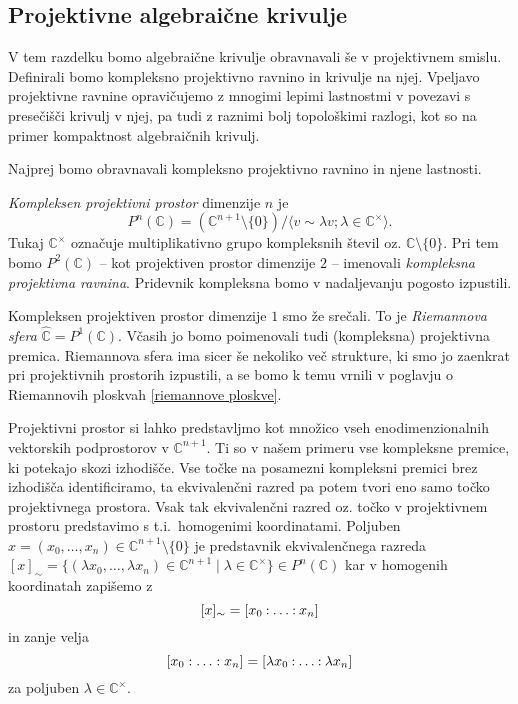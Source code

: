 \documentclass[mat1]{fmfdelo}
\numberwithin{equation}{section}
\newcommand{\C}{\mathbb C}
\newcommand{\CM}{\mathbb C ^\times}
\newcommand{\PC}{P^2(\mathbb C)}
\newcommand{\pcoor}[1]{%
\begingroup\lccode`~=`: \lowercase{\endgroup
\edef~}{\mathbin{\mathchar\the\mathcode`:}\nobreak}%
\left[%
\begingroup
\mathcode`:=\string"8000
#1%
\endgroup
\right]%
}
\theoremstyle{definition}
\begin{document}
 

\subsection{Projektivne algebraične krivulje}

V tem razdelku bomo algebraične krivulje obravnavali še v projektivnem smislu. Definirali bomo kompleksno projektivno ravnino in krivulje na njej. Vpeljavo projektivne ravnine opravičujemo z mnogimi lepimi lastnostmi v povezavi s presečišči krivulj v njej, pa tudi z raznimi bolj topološkimi razlogi, kot so na primer kompaktnost algebraičnih krivulj.

Najprej bomo obravnavali kompleksno projektivno ravnino in njene lastnosti. 
\begin{definicija}
    \emph{Kompleksen projektivni prostor} dimenzije $n$ je 
    \[
        P^n(\C) = (\C^{n+1} \setminus \{0 \}) / \langle v \sim \lambda v; \lambda \in \C^{\times} \rangle.
    \]
    Tukaj $\C^{\times}$ označuje multiplikativno grupo kompleksnih števil oz. $\C \setminus \{0 \}$. 
    Pri tem bomo $\PC$ -- kot projektiven prostor dimenzije $2$ -- imenovali \emph{kompleksna projektivna ravnina}. Pridevnik kompleksna bomo v nadaljevanju pogosto izpustili.
\end{definicija}

\begin{primer*}
    Kompleksen projektiven prostor dimenzije $1$ smo že srečali. To je \emph{Riemannova sfera} $\widehat{\C} = P^1(\C)$. Včasih jo bomo poimenovali tudi (kompleksna) projektivna premica. Riemannova sfera ima sicer še nekoliko več strukture, ki smo jo zaenkrat pri projektivnih prostorih izpustili, a se bomo k temu vrnili v poglavju o Riemannovih ploskvah \ref{riemannove ploskve}.
\end{primer*}

Projektivni prostor si lahko predstavljmo kot množico vseh enodimenzionalnih vektorskih podprostorov v $\C^{n+1}$. Ti so v našem primeru vse kompleksne premice, ki potekajo skozi izhodišče. Vse točke na posamezni kompleksni premici brez izhodišča identificiramo, ta ekvivalenčni razred pa potem tvori eno samo točko projektivnega prostora. Vsak tak ekvivalenčni razred oz. točko v projektivnem prostoru predstavimo s t.i.\ homogenimi koordinatami. Poljuben $x = (x_0, \dots, x_n) \in \C^{n+1}\setminus \{0\}$ je predstavnik ekvivalenčnega razreda $[x]_\sim = \{(\lambda x_0, \dots, \lambda x_n) \in \C^{n+1} \mid \lambda \in \CM\} \in P^n(\C)$ kar v homogenih koordinatah zapišemo z
    \[
        [x]_\sim = \pcoor{x_0 : \ldots : x_n}
    \]
in zanje velja
    \[
        [x_0: \ldots: x_n] = \pcoor{\lambda x_0: \ldots: \lambda x_n}
    \]
za poljuben $\lambda \in \CM$.
\end{document}
